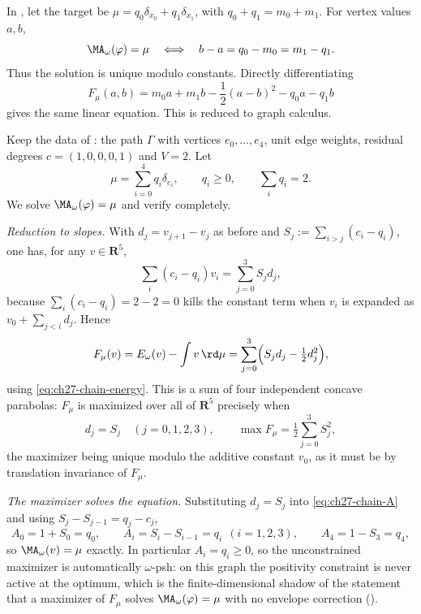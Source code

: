 \begin{example}
In , let the target be
\(\mu=q_0\delta_{x_0}+q_1\delta_{x_1}\), with
\(q_0+q_1=m_0+m_1\). For vertex values \(a,b\),
\[
 \MA_\omega(\varphi)=\mu
 \quad\Longleftrightarrow\quad
 b-a=q_0-m_0=m_1-q_1.
\]
Thus the solution is unique modulo constants. Directly differentiating
\[
 F_\mu(a,b)
 =m_0a+m_1b-\frac12(a-b)^2-q_0a-q_1b
\]
gives the same linear equation. This is
 reduced to graph calculus.
\end{example}

\begin{example}
\label{ex:ch27-euler-lagrange-chain}
Keep the data of : the path \(\Gamma\) with
vertices \(e_0,\dots,e_4\), unit edge weights, residual degrees
\(c=(1,0,0,0,1)\) and \(V=2\).  Let
\[
 \mu=\sum_{i=0}^4q_i\delta_{e_i},
 \qquad q_i\geq0,\qquad \sum_iq_i=2 .
\]
We solve \(\MA_\omega(\varphi)=\mu\) and verify
 completely.

\emph{Reduction to slopes.}  With \(d_j=v_{j+1}-v_j\) as before and
\(S_j:=\sum_{i>j}(c_i-q_i)\), one has, for any \(v\in\mathbf R^5\),
\[
 \sum_i(c_i-q_i)v_i=\sum_{j=0}^3S_jd_j,
\]
because \(\sum_i(c_i-q_i)=2-2=0\) kills the constant term when \(v_i\) is
expanded as \(v_0+\sum_{j<i}d_j\).  Hence
\begin{equation}\label{eq:ch27-chain-variational}
 F_\mu(v)=E_\omega(v)-\int v\,\rd\mu
 =\sum_{j=0}^3\Bigl(S_jd_j-\tfrac12d_j^2\Bigr),
\end{equation}
using \eqref{eq:ch27-chain-energy}.  This is a sum of four independent
concave parabolas: \(F_\mu\) is maximized over all of \(\mathbf R^5\)
precisely when
\[
 d_j=S_j\quad(j=0,1,2,3),
 \qquad
 \max F_\mu=\tfrac12\sum_{j=0}^3S_j^2 ,
\]
the maximizer being unique modulo the additive constant \(v_0\), as it must
be by translation invariance of \(F_\mu\).

\emph{The maximizer solves the equation.}  Substituting \(d_j=S_j\) into
\eqref{eq:ch27-chain-A} and using \(S_j-S_{j-1}=q_j-c_j\),
\[
 A_0=1+S_0=q_0,\qquad
 A_i=S_i-S_{i-1}=q_i\ \ (i=1,2,3),\qquad
 A_4=1-S_3=q_4 ,
\]
so \(\MA_\omega(v)=\mu\) exactly.  In particular \(A_i=q_i\geq0\), so the
unconstrained maximizer is automatically \(\omega\)-psh: on this graph the
positivity constraint is never active at the optimum, which is the
finite-dimensional shadow of the statement that a maximizer of \(F_\mu\)
solves \(\MA_\omega(\varphi)=\mu\) with no envelope correction
().


\end{example}

